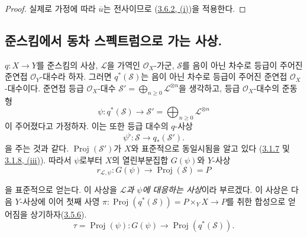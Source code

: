 \begin{proof}
실제로 가정에 따라 $\overline{u}$는 전사이므로
(\hyperref[II.3.6.2-ko]{3.6.2, (i)})을 적용한다.
\end{proof}

\subsection{준스킴에서 동차 스펙트럼으로 가는 사상.}
\label{subsection:II.3.7-ko}

\begin{env}[3.7.1]
\label{II.3.7.1-ko}
$q:X\to Y$를 준스킴의 사상, $\mathcal{L}$을 가역인
$\mathcal{O}_X$-가군, $\mathcal{S}$를 음이 아닌 차수로 등급이 주어진
준연접 $\mathcal{O}_Y$-대수라 하자. 그러면 $q^*(\mathcal{S})$는 음이
아닌 차수로 등급이 주어진 준연접 $\mathcal{O}_X$-대수이다.
준연접 등급 $\mathcal{O}_X$-대수
$\mathcal{S}'=\bigoplus_{n\geq0}\mathcal{L}^{\otimes n}$을 생각하고,
등급 $\mathcal{O}_X$-대수의 준동형
\[
  \psi:q^*(\mathcal{S})\longrightarrow
  \mathcal{S}'=\bigoplus_{n\geq0}\mathcal{L}^{\otimes n}
\]
이 주어졌다고 가정하자. 이는 또한 등급 대수의 $q$-사상
\[
  \psi^\flat:\mathcal{S}\longrightarrow q_*(\mathcal{S}').
\]
을 주는 것과 같다. $\operatorname{Proj}(\mathcal{S}')$가 $X$와
표준적으로 동일시됨을 알고 있다
(\hyperref[II.3.1.7-ko]{3.1.7} 및
\hyperref[II.3.1.8-ko]{3.1.8, (iii)}). 따라서 $\psi$로부터 $X$의
열린부분집합 $G(\psi)$와 $Y$-사상
\[
\label{II.3.7.1.1-ko}
  r_{\mathcal{L},\psi}:G(\psi)\longrightarrow
  \operatorname{Proj}(\mathcal{S})=P
\tag{3.7.1.1}
\]


을 표준적으로 얻는다. 이 사상을 \emph{$\mathcal{L}$과 $\psi$에 대응하는
사상}이라 부르겠다. 이 사상은 다음 $Y$-사상에 이어 첫째 사영
$\pi:\operatorname{Proj}(q^*(\mathcal{S}))=P\times_YX\to P$를 취한
합성으로 얻어짐을 상기하자(\hyperref[II.3.5.6-ko]{3.5.6}).
\[
  \tau=\operatorname{Proj}(\psi):G(\psi)\longrightarrow
  \operatorname{Proj}(q^*(\mathcal{S})).
\]
\end{env}

